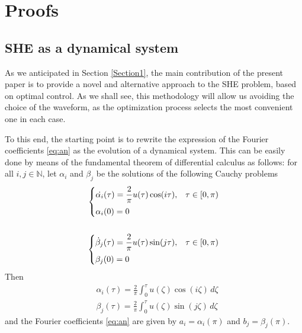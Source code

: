 \section{Proofs}

\subsection{SHE as a dynamical system}\label{Section3}

As we anticipated in Section \ref{Section1}, the main contribution of the present paper is to provide a novel and alternative approach to the SHE problem, based on optimal control. As we shall see, this methodology will allow us avoiding the choice of the waveform, as the optimization process selects the most convenient one in each case. 

To this end, the starting point is to rewrite the expression of the Fourier coefficients \eqref{eq:an} as the evolution of a dynamical system. This can be easily done by means of the fundamental theorem of differential calculus as follows: for all $i,j\in\mathbb{N}$, let $\alpha_i$ and $\beta_j$ be the solutions of the following Cauchy problems
\begin{align}\label{eq:Cauchy}
	\begin{cases} 
		\displaystyle\dot{\alpha_i}(\tau)  = \frac{2}{\pi}u(\tau)\cos(i\tau), & \tau\in [0,\pi) 
		\\[6pt]  
		\alpha_i(0)  = 0       
	\end{cases} \notag 
	\\
	\\
	\begin{cases} 
		\displaystyle\dot{\beta}_j(\tau)  = \frac{2}{\pi}u(\tau)\sin(j\tau), & \tau\in [0,\pi) 
		\\[6pt]  
		\beta_j(0) = 0       
	\end{cases}\notag
\end{align}
Then 
\begin{align*}
	&\alpha_i(\tau)= \frac{2}{\pi}\int_0^\tau u(\zeta) \cos(i\zeta)\,d\zeta 
	\\[5pt]
	&\beta_j(\tau) = \frac{2}{\pi}\int_0^\tau u(\zeta) \sin(j\zeta)\,d\zeta 
\end{align*}
and the Fourier coefficients \eqref{eq:an} are given by $a_i=\alpha_i(\pi)$ and $b_j=\beta_j(\pi)$.  

